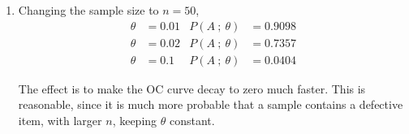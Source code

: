 \begin{enumerate}
    \item Changing the sample size to $ n = 50 $,
          \begin{align}
              \theta & = 0.01 & P(A\ ;\ \theta) & = 0.9098 \\
              \theta & = 0.02 & P(A\ ;\ \theta) & = 0.7357 \\
              \theta & = 0.1  & P(A\ ;\ \theta) & = 0.0404
          \end{align}
          \begin{figure}[H]
              \centering
              \anitabletwo
              \anitableone
          \end{figure}
          The effect is to make the OC curve decay to zero much faster. This is
          reasonable, since it is much more probable that a sample contains a defective
          item, with larger $ n $, keeping $ \theta $ constant.


\end{enumerate}
